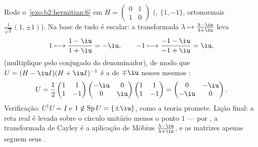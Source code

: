 \begin{example}\label{ex:b2:hermitian:cayleyrun}
Rode o~\cref{exo:b2:hermitian:6} em $H = \begin{pmatrix} 0 & 1\\
1 & 0\end{pmatrix}$ (,  $\{1, -1\}$,
 ortonormais $\frac{1}{\sqrt2}(1, \pm1)$). Na
base de  tudo é escalar: a transformada $\lambda
\mapsto \frac{\lambda - \iu}{\lambda + \iu}$ leva
\[
1 \longmapsto \frac{1 - \iu}{1 + \iu} = -\iu,
\qquad
-1 \longmapsto \frac{-1 - \iu}{-1 + \iu} = \iu ,
\]
(multiplique pelo conjugado do denominador), de modo que $U = (H -
\iu I)(H + \iu I)^{-1}$ é a  de 
$\mp\iu$ nesses mesmos :
\[
U = \frac{1}{2}\begin{pmatrix} 1 & 1\\ 1 & -1\end{pmatrix}
\begin{pmatrix} -\iu & 0\\ 0 & \iu\end{pmatrix}
\begin{pmatrix} 1 & 1\\ 1 & -1\end{pmatrix}
= \begin{pmatrix} 0 & -\iu\\ -\iu & 0\end{pmatrix} .
\]
Verificação: $U^\dagger U = I$ e $1 \notin \operatorname{Sp}U =
\{\pm\iu\}$, como a teoria promete. Lição final: a reta
real é levada sobre o círculo unitário menos o ponto $1$ ---
 por , a transformada de Cayley é a
aplicação de Möbius $\frac{\lambda-\iu}{\lambda+\iu}$, e as matrizes
apenas seguem seus .
\end{example}


